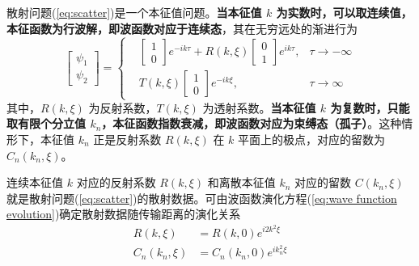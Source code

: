 散射问题(\ref{eq:scatter})是一个本征值问题。{\bfseries 当本征值 $k$ 为实数时，可以取连续值，本征函数为行波解，即波函数对应于连续态}，其在无穷远处的渐进行为
\begin{equation}
    \begin{bmatrix}
        \psi_1\\
        \psi_2
    \end{bmatrix}=\left\{\begin{aligned}
        &\begin{bmatrix}
            1\\
            0
        \end{bmatrix}e^{-ik\tau}+R(k,\xi)\begin{bmatrix}
            0\\
            1
        \end{bmatrix}e^{ik\tau}, & \tau\to-\infty\\
        &T(k,\xi)\begin{bmatrix}
            1\\
            0
        \end{bmatrix}e^{-ik\xi}, & \tau\to\infty
    \end{aligned}\right.
\end{equation}
其中，$R(k,\xi)$ 为反射系数，$T(k,\xi)$ 为透射系数。{\bfseries 当本征值 $k$ 为复数时，只能取有限个分立值 $k_n$，本征函数指数衰减，即波函数对应为束缚态（孤子）}。这种情形下，本征值 $k_n$ 正是反射系数 $R(k,\xi)$ 在 $k$ 平面上的极点，对应的留数为 $C_{n}(k_n,\xi)$\cite{guoyucui}。

连续本征值 $k$ 对应的反射系数 $R(k,\xi)$ 和离散本征值 $k_n$ 对应的留数 $C(k_n,\xi)$ 就是散射问题(\ref{eq:scatter})的散射数据。可由波函数演化方程(\ref{eq:wave function evolution})确定散射数据随传输距离的演化关系
\begin{subequations}
    \begin{align}
        R(k,\xi)&=R(k,0)e^{i2k^2\xi}\\
        C_n(k_n,\xi)&=C_n(k_n,0)e^{ik_n^2\xi}
    \end{align}
\end{subequations}


